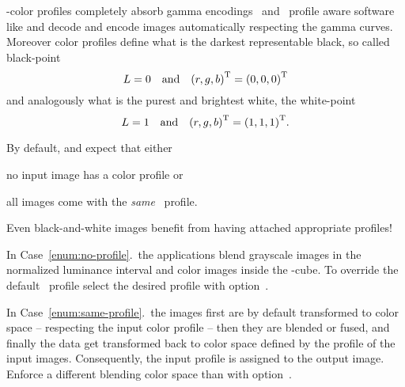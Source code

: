 %
%
%
%
-color profiles completely absorb gamma
encodings~ and ~profile aware software like
\App{} and \OtherApp{} decode and encode images automatically respecting the gamma curves.
Moreover color profiles define what is the darkest representable black, so called black-point
\[
  L = 0
  \quad \mbox{and}\quad
  {(r, g, b)}^{\mathrm{T}} = {(0, 0, 0)}^{\mathrm{T}}
\]
and analogously what is the purest and brightest white, the white-point
\[
  L = 1
  \quad \mbox{and}\quad
  {(r, g, b)}^{\mathrm{T}} = {(1, 1, 1)}^{\mathrm{T}}.
\]

\noindent By default, \App{} and \OtherApp{} expect that either

\begin{compactenumerate}
\item\label{enum:no-profile}
  no input image has a color profile or
\item\label{enum:same-profile}
  all images come with the \emph{same} ~profile.
\end{compactenumerate}

%
%
Even black-and-white images benefit from having attached appropriate profiles!

%
%
%
%
In Case~\ref{enum:no-profile}.\ the applications blend grayscale images in the normalized
luminance interval and color images inside the -cube.  To override the default
~profile select the desired profile with
option~.

In Case~\ref{enum:same-profile}.\ the images first are by default transformed to
 color space -- respecting the input color profile --
then they are blended or fused, and finally the data get transformed back to  color
space defined by the profile of the input images.  Consequently, the input profile is assigned
to the output image.  Enforce a different blending color space than  with
option~.

